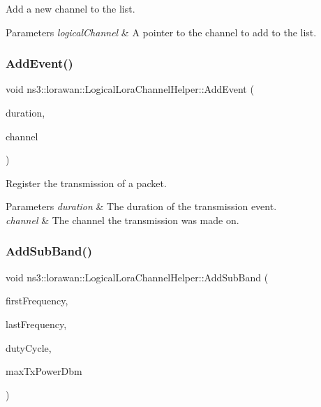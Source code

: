 Add a new channel to the list.


\begin{DoxyParams}{Parameters}
{\em logical\+Channel} & A pointer to the channel to add to the list. \\
\hline
\end{DoxyParams}
\mbox{\label{classns3_1_1lorawan_1_1LogicalLoraChannelHelper_ae48a646b236962de394678f054d5fc7b}} 
\subsubsection{\texorpdfstring{Add\+Event()}{AddEvent()}}
{\footnotesize\ttfamily void ns3\+::lorawan\+::\+Logical\+Lora\+Channel\+Helper\+::\+Add\+Event (\begin{DoxyParamCaption}\item[{Time}]{duration,  }\item[{Ptr$<$ \hyperlink{classns3_1_1lorawan_1_1LogicalLoraChannel}{Logical\+Lora\+Channel} $>$}]{channel }\end{DoxyParamCaption})}

Register the transmission of a packet.


\begin{DoxyParams}{Parameters}
{\em duration} & The duration of the transmission event. \\
\hline
{\em channel} & The channel the transmission was made on. \\
\hline
\end{DoxyParams}
\mbox{\label{classns3_1_1lorawan_1_1LogicalLoraChannelHelper_ad9e5112354a7fd98202a33b1fc936c83}} 
\subsubsection{\texorpdfstring{Add\+Sub\+Band()}{AddSubBand()}\hspace{0.1cm}{\footnotesize\ttfamily [1/2]}}
{\footnotesize\ttfamily void ns3\+::lorawan\+::\+Logical\+Lora\+Channel\+Helper\+::\+Add\+Sub\+Band (\begin{DoxyParamCaption}\item[{double}]{first\+Frequency,  }\item[{double}]{last\+Frequency,  }\item[{double}]{duty\+Cycle,  }\item[{double}]{max\+Tx\+Power\+Dbm }\end{DoxyParamCaption})}

